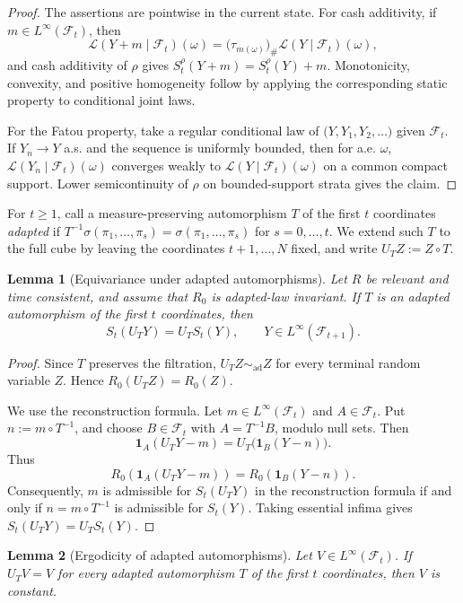 \documentclass[a4paper]{amsart}
\newtheorem{lemma}[lemma]{Lemma}
\theoremstyle{definition}
\newcommand{\F}{\mathcal{F}}
\newcommand{\simad}{\sim_{\mathrm{ad}}}
\newcommand{\law}{\mathcal{L}}
\begin{document}
\begin{proof}
The assertions are pointwise in the current state. For cash additivity, if
\(m\in L^\infty(\F_t)\), then
\[
\law(Y+m\mid\F_t)(\omega)
=
\big(\tau_{m(\omega)}\big)_\#\law(Y\mid\F_t)(\omega),
\]
and cash additivity of \(\rho\) gives \(S_t^\rho(Y+m)=S_t^\rho(Y)+m\).
Monotonicity, convexity, and positive homogeneity follow by applying the
corresponding static property to conditional joint laws.

For the Fatou property, take a regular conditional law of
\(\big(Y,Y_1,Y_2,\dots\big)\) given \(\F_t\). If \(Y_n\to Y\) a.s. and the
sequence is uniformly bounded, then for a.e. \(\omega\),
\(\law(Y_n\mid\F_t)(\omega)\) converges weakly to
\(\law(Y\mid\F_t)(\omega)\) on a common compact support. Lower semicontinuity
of \(\rho\) on bounded-support strata gives the claim.
\end{proof}

For \(t\ge1\), call a measure-preserving automorphism \(T\) of the first
\(t\) coordinates \emph{adapted} if
\(T^{-1}\sigma(\pi_1,\dots,\pi_s)=\sigma(\pi_1,\dots,\pi_s)\) for
\(s=0,\dots,t\). We extend such \(T\) to the full cube by leaving the
coordinates \(t+1,\dots,N\) fixed, and write \(U_TZ:=Z\circ T\).

\begin{lemma}[Equivariance under adapted automorphisms]
\label{lem:adapted-automorphism-equivariance}
Let \(R\) be relevant and time consistent, and assume that \(R_0\) is
adapted-law invariant. If \(T\) is an adapted automorphism of the first
\(t\) coordinates, then
\[
S_t(U_TY)=U_TS_t(Y),
\qquad Y\in L^\infty(\F_{t+1}).
\]
\end{lemma}

\begin{proof}
Since \(T\) preserves the filtration, \(U_TZ\simad Z\) for every terminal
random variable \(Z\). Hence \(R_0(U_TZ)=R_0(Z)\).

We use the reconstruction formula. Let \(m\in L^\infty(\F_t)\) and
\(A\in\F_t\). Put \(n:=m\circ T^{-1}\), and choose \(B\in\F_t\) with
\(A=T^{-1}B\), modulo null sets. Then
\[
\mathbf 1_A(U_TY-m)=U_T\bigl(\mathbf 1_B(Y-n)\bigr).
\]
Thus
\[
R_0(\mathbf 1_A(U_TY-m))
=
R_0(\mathbf 1_B(Y-n)).
\]
Consequently, \(m\) is admissible for \(S_t(U_TY)\) in the reconstruction
formula if and only if \(n=m\circ T^{-1}\) is admissible for \(S_t(Y)\). Taking
essential infima gives \(S_t(U_TY)=U_TS_t(Y)\).
\end{proof}

\begin{lemma}[Ergodicity of adapted automorphisms]
\label{lem:adapted-automorphism-ergodicity}
Let \(V\in L^\infty(\F_t)\). If \(U_TV=V\) for every adapted automorphism
\(T\) of the first \(t\) coordinates, then \(V\) is constant.
\end{lemma}
\end{document}

